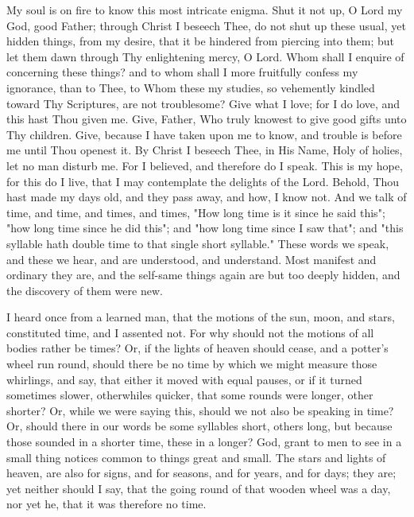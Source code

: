 \documentclass[b5paper,openright,12pt,twoside]{book}
\begin{document}
My soul is on fire to know this most intricate enigma. Shut it not up, O
Lord my God, good Father; through Christ I beseech Thee, do not shut up
these usual, yet hidden things, from my desire, that it be hindered from
piercing into them; but let them dawn through Thy enlightening mercy, O
Lord. Whom shall I enquire of concerning these things? and to whom shall
I more fruitfully confess my ignorance, than to Thee, to Whom these
my studies, so vehemently kindled toward Thy Scriptures, are not
troublesome? Give what I love; for I do love, and this hast Thou
given me. Give, Father, Who truly knowest to give good gifts unto Thy
children. Give, because I have taken upon me to know, and trouble is
before me until Thou openest it. By Christ I beseech Thee, in His Name,
Holy of holies, let no man disturb me. For I believed, and therefore do
I speak. This is my hope, for this do I live, that I may contemplate the
delights of the Lord. Behold, Thou hast made my days old, and they pass
away, and how, I know not. And we talk of time, and time, and times, and
times, "How long time is it since he said this"; "how long time since he
did this"; and "how long time since I saw that"; and "this syllable hath
double time to that single short syllable." These words we speak, and
these we hear, and are understood, and understand. Most manifest and
ordinary they are, and the self-same things again are but too deeply
hidden, and the discovery of them were new.

I heard once from a learned man, that the motions of the sun, moon,
and stars, constituted time, and I assented not. For why should not
the motions of all bodies rather be times? Or, if the lights of heaven
should cease, and a potter's wheel run round, should there be no time
by which we might measure those whirlings, and say, that either it
moved with equal pauses, or if it turned sometimes slower, otherwhiles
quicker, that some rounds were longer, other shorter? Or, while we were
saying this, should we not also be speaking in time? Or, should there
in our words be some syllables short, others long, but because those
sounded in a shorter time, these in a longer? God, grant to men to see
in a small thing notices common to things great and small. The stars and
lights of heaven, are also for signs, and for seasons, and for years,
and for days; they are; yet neither should I say, that the going round
of that wooden wheel was a day, nor yet he, that it was therefore no
time.
\end{document}
